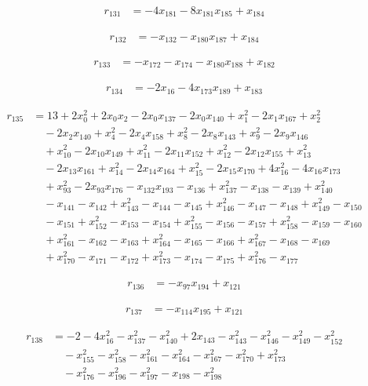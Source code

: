 \begin{align*}
r_{131}&=-4x_{181}-8x_{181}x_{185}+x_{184}
\end{align*}

\begin{align*}
r_{132}&=-x_{132}-x_{180}x_{187}+x_{184}
\end{align*}

\begin{align*}
r_{133}&=-x_{172}-x_{174}-x_{180}x_{188}+x_{182}
\end{align*}

\begin{align*}
r_{134}&=-2x_{16}-4x_{173}x_{189}+x_{183}
\end{align*}

\begin{align*}
r_{135}&=13+2x_{0}^{2}+2x_{0}x_{2}-2x_{0}x_{137}-2x_{0}x_{140}+x_{1}^{2}-2x_{1}x_{167}+x_{2}^{2}\\
&\quad -2x_{2}x_{140}+x_{4}^{2}-2x_{4}x_{158}+x_{8}^{2}-2x_{8}x_{143}+x_{9}^{2}-2x_{9}x_{146}\\
&\quad +x_{10}^{2}-2x_{10}x_{149}+x_{11}^{2}-2x_{11}x_{152}+x_{12}^{2}-2x_{12}x_{155}+x_{13}^{2}\\
&\quad -2x_{13}x_{161}+x_{14}^{2}-2x_{14}x_{164}+x_{15}^{2}-2x_{15}x_{170}+4x_{16}^{2}-4x_{16}x_{173}\\
&\quad +x_{93}^{2}-2x_{93}x_{176}-x_{132}x_{193}-x_{136}+x_{137}^{2}-x_{138}-x_{139}+x_{140}^{2}\\
&\quad -x_{141}-x_{142}+x_{143}^{2}-x_{144}-x_{145}+x_{146}^{2}-x_{147}-x_{148}+x_{149}^{2}-x_{150}\\
&\quad -x_{151}+x_{152}^{2}-x_{153}-x_{154}+x_{155}^{2}-x_{156}-x_{157}+x_{158}^{2}-x_{159}-x_{160}\\
&\quad +x_{161}^{2}-x_{162}-x_{163}+x_{164}^{2}-x_{165}-x_{166}+x_{167}^{2}-x_{168}-x_{169}\\
&\quad +x_{170}^{2}-x_{171}-x_{172}+x_{173}^{2}-x_{174}-x_{175}+x_{176}^{2}-x_{177}
\end{align*}

\begin{align*}
r_{136}&=-x_{97}x_{194}+x_{121}
\end{align*}

\begin{align*}
r_{137}&=-x_{114}x_{195}+x_{121}
\end{align*}

\begin{align*}
r_{138}&=-2-4x_{16}^{2}-x_{137}^{2}-x_{140}^{2}+2x_{143}-x_{143}^{2}-x_{146}^{2}-x_{149}^{2}-x_{152}^{2}\\
&\quad -x_{155}^{2}-x_{158}^{2}-x_{161}^{2}-x_{164}^{2}-x_{167}^{2}-x_{170}^{2}+x_{173}^{2}\\
&\quad -x_{176}^{2}-x_{196}^{2}-x_{197}^{2}-x_{198}-x_{198}^{2}
\end{align*}

